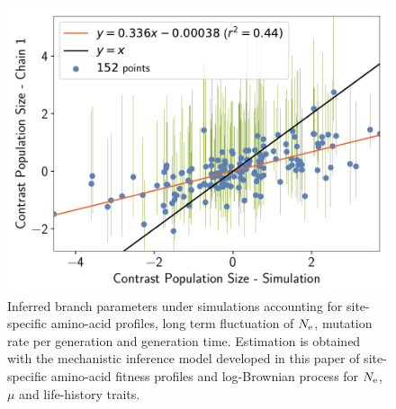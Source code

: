 \documentclass{article}
\begin{document}
\begin{figure}[H]
\begin{minipage}{0.32\linewidth}
			\includegraphics[width=\linewidth, page=1]{simulations/BranchWise_SimuDiv_SiteMutSelBranchNe_BranchCorrelation_ContrastPopulationSize}
		\end{minipage} \hfill
		\caption[Inferred branch parameters for \texttt{SimuDiv}]{
		Inferred branch parameters under simulations accounting for site-specific amino-acid profiles, long term fluctuation of $N_{\text{e}}$, mutation rate per generation and generation time.
		Estimation is obtained with the mechanistic inference model developed in this paper of site-specific amino-acid fitness profiles and log-Brownian process for $N_{\text{e}}$, $\mu$ and life-history traits.
		}
	\end{figure}
\end{document}
